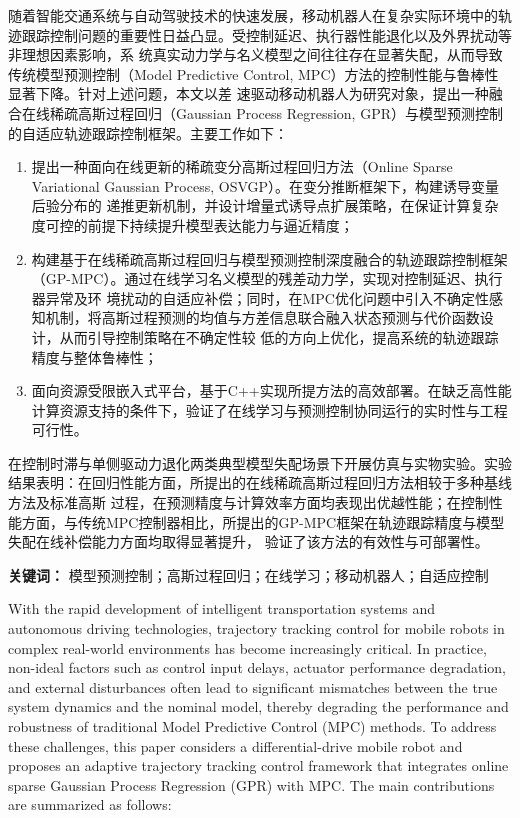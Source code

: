 \cleardoublepage
{}

随着智能交通系统与自动驾驶技术的快速发展，移动机器人在复杂实际环境中的轨迹跟踪控制问题的重要性日益凸显。受控制延迟、执行器性能退化以及外界扰动等非理想因素影响，系
统真实动力学与名义模型之间往往存在显著失配，从而导致传统模型预测控制（Model Predictive Control, MPC）方法的控制性能与鲁棒性显著下降。针对上述问题，本文以差
速驱动移动机器人为研究对象，提出一种融合在线稀疏高斯过程回归（Gaussian Process Regression, GPR）与模型预测控制的自适应轨迹跟踪控制框架。主要工作如下：

\begin{enumerate}
    \item 提出一种面向在线更新的稀疏变分高斯过程回归方法（Online Sparse Variational Gaussian Process, OSVGP）。在变分推断框架下，构建诱导变量后验分布的
    递推更新机制，并设计增量式诱导点扩展策略，在保证计算复杂度可控的前提下持续提升模型表达能力与逼近精度；

    \item 构建基于在线稀疏高斯过程回归与模型预测控制深度融合的轨迹跟踪控制框架（GP-MPC）。通过在线学习名义模型的残差动力学，实现对控制延迟、执行器异常及环
    境扰动的自适应补偿；同时，在MPC优化问题中引入不确定性感知机制，将高斯过程预测的均值与方差信息联合融入状态预测与代价函数设计，从而引导控制策略在不确定性较
    低的方向上优化，提高系统的轨迹跟踪精度与整体鲁棒性；

    \item 面向资源受限嵌入式平台，基于C++实现所提方法的高效部署。在缺乏高性能计算资源支持的条件下，验证了在线学习与预测控制协同运行的实时性与工程可行性。
\end{enumerate}

在控制时滞与单侧驱动力退化两类典型模型失配场景下开展仿真与实物实验。实验结果表明：在回归性能方面，所提出的在线稀疏高斯过程回归方法相较于多种基线方法及标准高斯
过程，在预测精度与计算效率方面均表现出优越性能；在控制性能方面，与传统MPC控制器相比，所提出的GP-MPC框架在轨迹跟踪精度与模型失配在线补偿能力方面均取得显著提升，
验证了该方法的有效性与可部署性。

\textbf{关键词：} 模型预测控制；高斯过程回归；在线学习；移动机器人；自适应控制

\cleardoublepage
{}

With the rapid development of intelligent transportation systems and autonomous driving technologies, trajectory tracking control for mobile
 robots in complex real-world environments has become increasingly critical. In practice, non-ideal factors such as control input delays, 
 actuator performance degradation, and external disturbances often lead to significant mismatches between the true system dynamics and the 
 nominal model, thereby degrading the performance and robustness of traditional Model Predictive Control (MPC) methods. To address these 
 challenges, this paper considers a differential-drive mobile robot and proposes an adaptive trajectory tracking control framework that 
 integrates online sparse Gaussian Process Regression (GPR) with MPC. The main contributions are summarized as follows:


